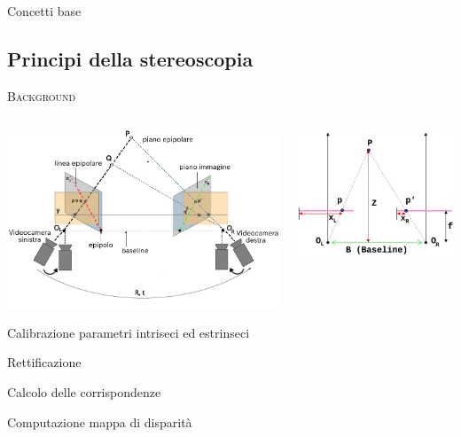 \documentclass{beamer}
\begin{document}
\begin{section}{Concetti base}
\subsection{Principi della stereoscopia}

\begin{frame}[t]{\textsc{Background}}
\begin{columns}
\begin{column}{5cm}
\includegraphics[width=1.1\linewidth]{./img/rect.png}
\begin{itemize}
\item[1.] \small{Calibrazione parametri intriseci ed estrinseci
\item[2.] Rettificazione
\item[3.] Calcolo delle corrispondenze
\item[4.] Computazione mappa di disparit\`{a}}
\end{itemize}
\end{column}
\begin{column}{5cm}
\includegraphics[width=0.8\linewidth]{./img/depth.jpg}

\end{column}
\end{columns}
\end{frame}
\end{section}
\end{document}
